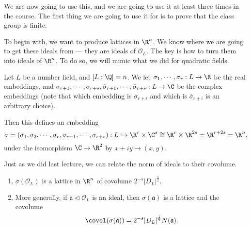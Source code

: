 \documentclass[a4paper]{article}
\begin{document}
We are now going to use this, and we are going to use it at least three times in the course. The first thing we are going to use it for is to prove that the class group is finite.

To begin with, we want to produce lattices in $\R^n$. We know where we are going to get these ideals from --- they are ideals of $\mathcal{O}_L$. The key is how to turn them into ideals of $\R^n$. To do so, we will mimic what we did for quadratic fields.

Let $L$ be a number field, and $[L:\Q] = n$. We let $\sigma_1, \cdots,\sigma_r: L \to \R$ be the real embeddings, and $\sigma_{r + 1}, \cdots, \sigma_{r + s},\bar{\sigma}_{r + 1}, \cdots, \bar{\sigma}_{r + s}: L \to \C$ be the complex embeddings (note that which embedding is $\sigma_{r + i}$ and which is $\bar{\sigma}_{r + i}$ is an arbitrary choice).

Then this defines an embedding
\[
  \sigma = (\sigma_1, \sigma_2, \cdots, \sigma_r, \sigma_{r + 1}, \cdots, \sigma_{r + s}): L \hookrightarrow \R^r \times \C^s \cong \R^r \times \R^{2s} = \R^{r + 2s} = \R^n,
\]
under the isomorphism $\C \to \R^2$ by $x + iy \mapsto (x, y)$.

Just as we did last lecture, we can relate the norm of ideals to their covolume.

\begin{lemma}\leavevmode
  \begin{enumerate}
    \item $\sigma(\mathcal{O}_L)$ is a lattice in $\R^n$ of covolume $2^{-s} |D_L|^{\frac{1}{2}}$.
    \item More generally, if $\mathfrak{a} \lhd \mathcal{O}_L$ is an ideal, then $\sigma(\mathfrak{a})$ is a lattice and the covolume
      \[
        \covol(\sigma(\mathfrak{a})) = 2^{-s} |D_L|^{\frac{1}{2}} N(\mathfrak{a}).
      \]
  \end{enumerate}
\end{lemma}
\end{document}

